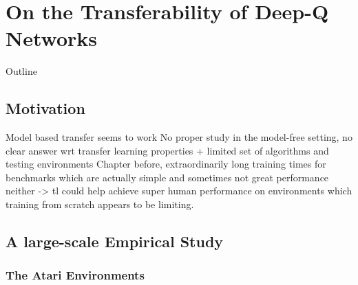 
\chapter{On the Transferability of Deep-Q Networks} %
\label{ch:dqn_transfer} %

\begin{remark}{Outline}
\end{remark}




\section{Motivation}

Model based transfer seems to work
No proper study in the model-free setting, no clear answer wrt transfer learning properties + limited set of algorithms and testing environments
Chapter before, extraordinarily long training times for benchmarks which are actually simple and sometimes not great performance neither -> tl could help achieve super human performance on environments which training from scratch appears to be limiting.


\section{A large-scale Empirical Study}
\label{sec:empirical_study}


\subsection{The Atari Environments}
\label{sec:atari_environments}

